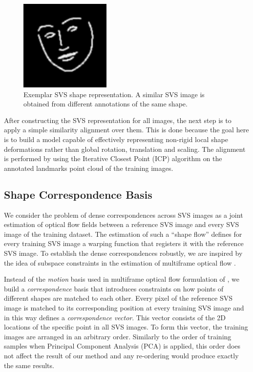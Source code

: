 \begin{figure}[b!]
    \centering
    \includegraphics[width=0.4\textwidth]{resources/svs2}
    \caption{Exemplar SVS shape representation. A similar SVS image is obtained from different annotations of the same shape.}
    \label{fig:build_svs}
\end{figure}


After constructing the SVS representation for all images, the next step is to apply a simple similarity alignment over them. This is done because the goal here is to build a model capable of effectively representing non-rigid local shape deformations rather than global rotation, translation and scaling. The alignment is performed by using the Iterative Closest Point (ICP) algorithm \cite{Besl1992} on the annotated landmarks point cloud of the training images.


\subsection{Shape Correspondence Basis}

We consider the problem of dense correspondences across SVS images as a joint estimation of optical flow fields between a reference SVS image and every SVS image of the training dataset. The estimation of such a ``shape flow'' defines for every training SVS image a warping function that registers it with the reference SVS image. To establish the dense correspondences robustly, we are inspired by the idea of subspace constraints in the estimation of multiframe optical flow \cite{Garg:2013hu}.

Instead of the \emph{motion} basis used in multiframe optical flow formulation of \cite{Garg:2013hu}, we build a \emph{correspondence} basis that introduces constraints on how points of different shapes are matched to each other. Every pixel of the reference SVS image is matched to its corresponding position at every training SVS image and in this way defines a \emph{correspondence vector}. This vector consists of the 2D locations of the specific point in all SVS images. To form this vector, the training images are arranged in an arbitrary order. Similarly to the order of training samples when Principal Component Analysis (PCA) is applied, this order does not affect the result of our method and any re-ordering would produce exactly the same results.


